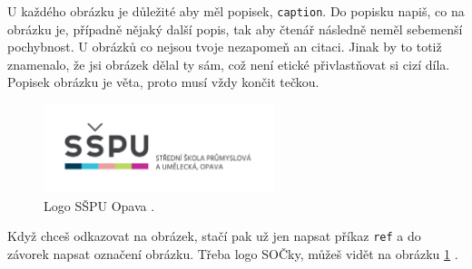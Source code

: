 \documentclass[12pt, a4paper,
oneside,      %
openany
]{report}
\begin{document}
	U každého obrázku je důležité aby měl popisek, \texttt{caption}. Do popisku napiš, co na obrázku je, případně nějaký další popis, tak aby čtenář následně neměl sebemenší pochybnost. U obrázků co nejsou tvoje nezapomeň an citaci. Jinak by to totiž znamenalo, že jsi obrázek dělal ty sám, což není etické přivlastňovat si cizí díla. Popisek obrázku je věta, proto musí vždy končit tečkou.
	
	\begin{figure}[h!]
		\centering %
		\includegraphics[width=0.6\textwidth]{image/logo-skoly.png} %
		\caption{Logo SŠPU Opava \cite{sspuLogo}.} %
		\label{fig:logoSSPU} %
	\end{figure}
	
	Když chceš odkazovat na obrázek, stačí pak už jen napsat příkaz \texttt{ref} a do závorek napsat označení obrázku. Třeba logo SOČky, můžeš vidět na obrázku \ref{fig:logoSSPU} \cite{socSSPU}.
	
\end{document}
